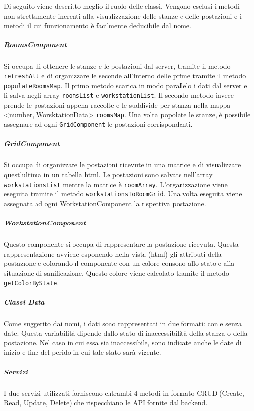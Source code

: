 Di seguito viene descritto meglio il ruolo delle classi. Vengono esclusi i metodi non strettamente inerenti alla visualizzazione delle stanze e delle postazioni e i metodi il cui funzionamento è facilmente deducibile dal nome.
\subparagraph{RoomsComponent}
Si occupa di ottenere le stanze e le postazioni dal server, tramite il metodo \texttt{refreshAll} e di organizzare le seconde all'interno delle prime tramite il metodo \texttt{populateRoomsMap}. Il primo metodo scarica in modo parallelo i dati dal server e li salva negli array \texttt{roomsList} e \texttt{workstationList}. Il secondo metodo invece prende le postazioni appena raccolte e le suddivide per stanza nella mappa <number, WorsktationData> \texttt{roomsMap}.
Una volta popolate le stanze, è possibile assegnare ad ogni \texttt{GridComponent} le postazioni corrispondenti.
\subparagraph{GridComponent}
Si occupa di organizzare le postazioni ricevute in una matrice e di visualizzare quest'ultima in un tabella html. Le postazioni sono salvate nell'array \texttt{workstationsList} mentre la matrice è \texttt{roomArray}. L'organizzazione viene eseguita tramite il metodo \texttt{workstationsToRoomGrid}. Una volta eseguita viene assegnata ad ogni WorkstationComponent la rispettiva postazione.
\subparagraph{WorkstationComponent}
Questo componente si occupa di rappresentare la postazione ricevuta. Questa rappresentazione avviene esponendo nella vista (html) gli attributi della postazione e colorando il componente con un colore consono allo stato e alla situazione di sanificazione. Questo colore viene calcolato tramite il metodo \texttt{getColorByState}.
\subparagraph{Classi Data}
Come suggerito dai nomi, i dati sono rappresentati in due formati: con e senza date.
Questa variabilità dipende dallo stato di inaccessibilità della stanza o della postazione. Nel caso in cui essa sia inaccessibile, sono indicate anche le date di inizio e fine del perido in cui tale stato sarà vigente.
\subparagraph{Servizi}
I due servizi utilizzati forniscono entrambi 4 metodi in formato CRUD (Create, Read, Update, Delete) che rispecchiano le API fornite dal backend.


